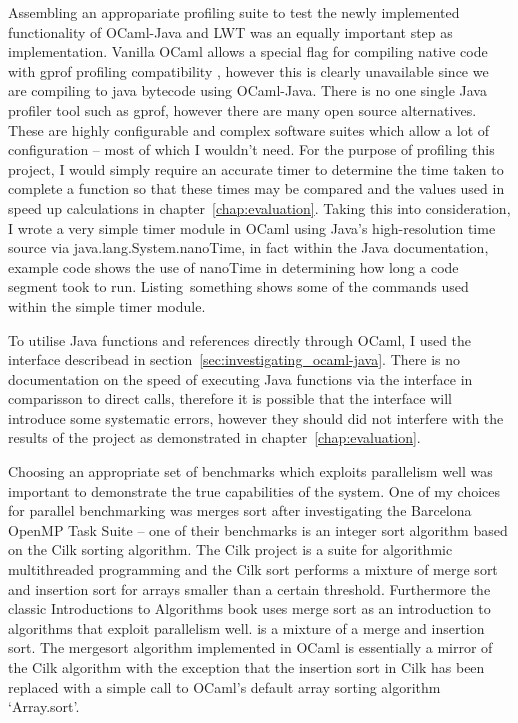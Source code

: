 \documentclass[12pt,twoside,notitlepage]{report}
\begin{document}
Assembling an appropariate profiling suite to test the newly implemented functionality of OCaml-Java and LWT was an equally important step as implementation. Vanilla OCaml allows a special flag for compiling native code with gprof
profiling compatibility \cite{leroy2013}, however this is clearly unavailable since we are compiling to java bytecode using OCaml-Java. There is no one single Java profiler tool such as gprof, however there are many open source
alternatives. These are highly configurable and complex software suites which allow a lot of configuration -- most of which I wouldn't need. For the purpose of profiling this project, I would simply require an accurate timer to
determine the time taken to complete a function so that these times may be compared and the values used in speed up calculations in chapter~\ref{chap:evaluation}. Taking this into consideration, I wrote a very simple timer module in
OCaml using Java's high-resolution time source via java.lang.System.nanoTime, in fact within the Java documentation, example code shows the use of nanoTime in determining how long a code segment took to run. Listing~something shows some of the commands used within the simple timer module.

To utilise Java functions and references directly through OCaml, I used the interface describead in section~\ref{sec:investigating_ocaml-java}. There is no documentation on the speed of executing Java functions via the interface in
comparisson to direct calls, therefore it is possible that the interface will introduce some systematic errors, however they should did not interfere with the results of the project as demonstrated in chapter~\ref{chap:evaluation}.

%
%
Choosing an appropriate set of benchmarks which exploits parallelism well was important to demonstrate the true capabilities of the system. One of my choices for parallel benchmarking was merges sort after investigating the Barcelona
OpenMP Task Suite -- one of their benchmarks is an integer sort algorithm based on the Cilk sorting algorithm. The Cilk project is a suite for algorithmic multithreaded programming and the Cilk sort performs a mixture of merge sort
and insertion sort for arrays smaller than a certain threshold. Furthermore the classic Introductions to Algorithms book \cite{cormen2009} uses merge sort as an introduction to algorithms that exploit parallelism well.  is a mixture of
a merge and insertion sort. The mergesort algorithm implemented in OCaml is essentially a mirror of the Cilk algorithm with the exception that the insertion sort in Cilk has been replaced with a simple call to OCaml's default array
sorting algorithm `Array.sort'.
\end{document}

